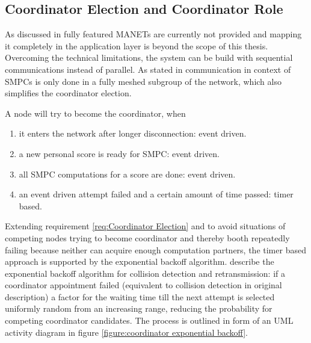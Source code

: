 		\subsection{Coordinator Election and Coordinator Role} \label{Coordinator Election}
		
		As discussed in  fully featured \glspl{MANET} are currently not provided and mapping it completely in the application layer is beyond the scope of this thesis. Overcoming the technical limitations, the system can be build with sequential communications instead of parallel. As stated in  communication in context of \glspl{SMPC} is only done in a fully meshed subgroup of the network, which also simplifies the coordinator election.
		
		\noindent A node will try to become the coordinator, when \nolinebreak
		\begin{enumerate}
			\item it enters the network after longer disconnection: event driven.
			\item a new personal score is ready for \gls{SMPC}: event driven.
			\item all \gls{SMPC} computations for a score are done: event driven.
			\item an event driven attempt failed and a certain amount of time passed: timer based.
		\end{enumerate}
		
		Extending requirement \ref{req:Coordinator Election} and to avoid situations of competing nodes trying to become coordinator and thereby booth repeatedly failing because neither can acquire enough computation partners, the timer based approach is supported by the exponential backoff algorithm. \textcite[p.67]{IEEE2010} describe the exponential backoff algorithm for collision detection and retransmission: if a coordinator appointment failed (equivalent to collision detection in original description) a factor for the waiting time till the next attempt is selected uniformly random from an increasing range, reducing the probability for competing coordinator candidates. The process is outlined in form of an \gls{UML} activity diagram in figure \ref{figure:coordinator exponential backoff}.
		
